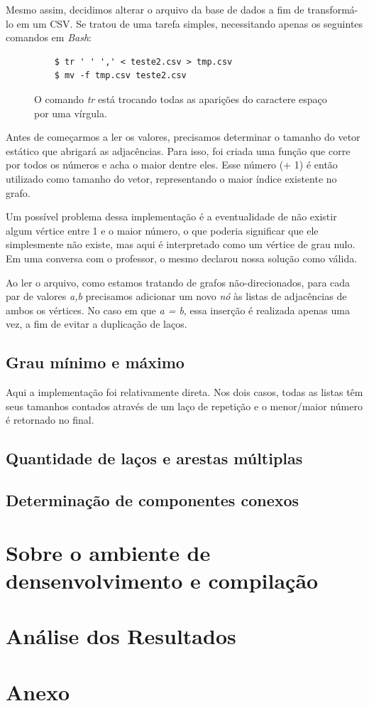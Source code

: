 \documentclass[a4paper, 12pt]{article}
\begin{document}
Mesmo assim, decidimos alterar o arquivo da base de dados a fim de transformá-lo
em um CSV. Se tratou de uma tarefa simples, necessitando apenas os seguintes comandos
em \textit{Bash}:

\begin{figure}[h]
\centering
	\begin{verbatim}
	$ tr ' ' ',' < teste2.csv > tmp.csv
	$ mv -f tmp.csv teste2.csv
	\end{verbatim}
	\vspace{-1.0cm}
	\caption{O comando \textit{tr} está trocando todas as aparições do caractere
	espaço por uma vírgula.}
\end{figure}

Antes de começarmos a ler os valores, precisamos determinar o tamanho do vetor
estático que abrigará as adjacências. Para isso, foi criada uma função que corre
por todos os números e acha o maior dentre eles. Esse número (+ 1) é então utilizado como
tamanho do vetor, representando o maior índice existente no grafo.

Um possível problema dessa implementação é a eventualidade de não existir algum
vértice entre 1 e o maior número, o que poderia significar que ele simplesmente
não existe, mas aqui é interpretado como um vértice de grau nulo. Em uma conversa
com o professor, o mesmo declarou nossa solução como válida.

Ao ler o arquivo, como estamos tratando de grafos não-direcionados, para cada par
de valores \textit{a,b} precisamos adicionar um novo \textit{nó} às listas de
adjacências de ambos os vértices. No caso em que \textit{a = b}, essa inserção é
realizada apenas uma vez, a fim de evitar a duplicação de laços.

\subsection{Grau mínimo e máximo}

Aqui a implementação foi relativamente direta. Nos dois casos, todas as listas
têm seus tamanhos contados através de um laço de repetição e o menor/maior número
é retornado no final.

\subsection{Quantidade de laços e arestas múltiplas}

\subsection{Determinação de componentes conexos}
\newpage

\section{Sobre o ambiente de densenvolvimento e compilação}

\newpage
\section{Análise dos Resultados}
\newpage

\section*{Anexo}
\end{document}
